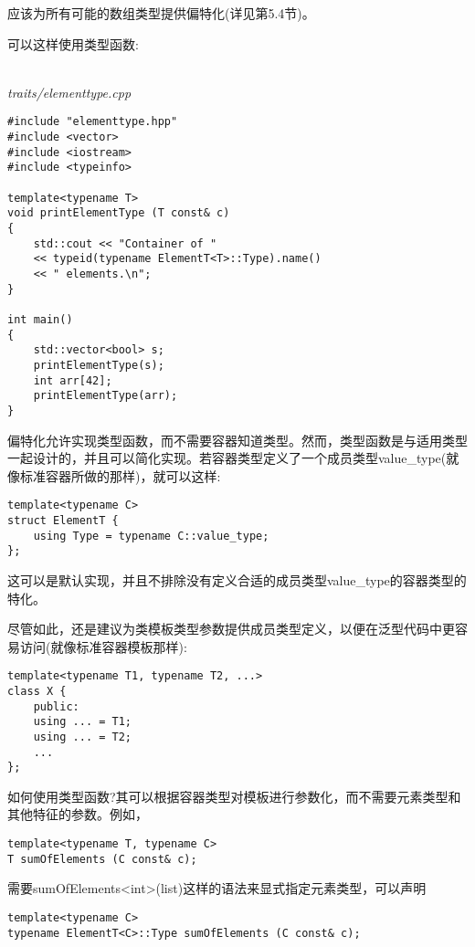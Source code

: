 应该为所有可能的数组类型提供偏特化(详见第5.4节)。

可以这样使用类型函数:

\hspace*{\fill} \\ %
\noindent
\textit{traits/elementtype.cpp}
\begin{lstlisting}[style=styleCXX]
#include "elementtype.hpp"
#include <vector>
#include <iostream>
#include <typeinfo>

template<typename T>
void printElementType (T const& c)
{
	std::cout << "Container of "
	<< typeid(typename ElementT<T>::Type).name()
	<< " elements.\n";
}

int main()
{
	std::vector<bool> s;
	printElementType(s);
	int arr[42];
	printElementType(arr);
}
\end{lstlisting}

偏特化允许实现类型函数，而不需要容器知道类型。然而，类型函数是与适用类型一起设计的，并且可以简化实现。若容器类型定义了一个成员类型value\_type(就像标准容器所做的那样)，就可以这样:

\begin{lstlisting}[style=styleCXX]
template<typename C>
struct ElementT {
	using Type = typename C::value_type;
};
\end{lstlisting}

这可以是默认实现，并且不排除没有定义合适的成员类型value\_type的容器类型的特化。

尽管如此，还是建议为类模板类型参数提供成员类型定义，以便在泛型代码中更容易访问(就像标准容器模板那样):

\begin{lstlisting}[style=styleCXX]
template<typename T1, typename T2, ...>
class X {
	public:
	using ... = T1;
	using ... = T2;
	...
};
\end{lstlisting}

如何使用类型函数?其可以根据容器类型对模板进行参数化，而不需要元素类型和其他特征的参数。例如，

\begin{lstlisting}[style=styleCXX]
template<typename T, typename C>
T sumOfElements (C const& c);
\end{lstlisting}

需要sumOfElements<int>(list)这样的语法来显式指定元素类型，可以声明

\begin{lstlisting}[style=styleCXX]
template<typename C>
typename ElementT<C>::Type sumOfElements (C const& c);
\end{lstlisting}

